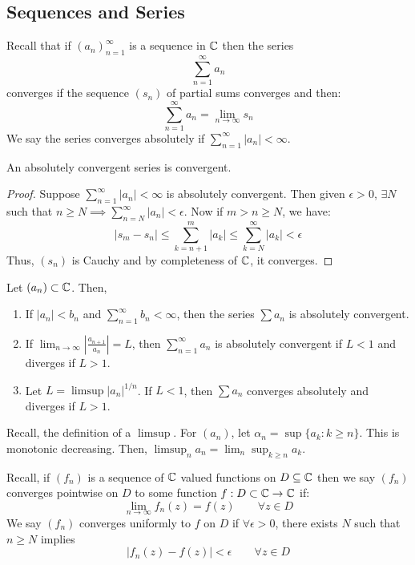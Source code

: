 \documentclass[12pt]{amsart}
\begin{document}
\newpage

\subsection{Sequences and Series}
Recall that if $(a_n)_{n=1}^\infty$ is a sequence in $\mathbb C$ then the series 
\[ \sum_{n=1}^\infty a_n\]
converges if the sequence $(s_n)$ of partial sums converges and then:
\[\sum_{n=1}^\infty a_n = \lim_{n\to \infty} s_n \]
We say the series converges absolutely if $\sum_{n=1}^\infty |a_n| < \infty$. 

\begin{lemma}[W 1.2.9]
    An absolutely convergent series is convergent.
\end{lemma}
\begin{proof}
    Suppose $\sum_{n=1}^\infty |a_n| < \infty$ is absolutely convergent. Then given $\epsilon > 0$, $\exists N$ such that $n \geq N \implies \sum_{n=N}^\infty |a_n| < \epsilon$. Now if $m > n \geq N$, we have: 
    \[ |s_m - s_n| \leq \sum_{k=n+1}^m | a_k | \leq \sum_{k = N}^\infty |a_k| < \epsilon\]
    Thus, $(s_n)$ is Cauchy and by completeness of $\mathbb C$, it converges. 
\end{proof}

\begin{theorem}[W 1.1.30]
    Let $(a_n) \subset \mathbb C$. Then,
    \begin{enumerate}
        \item If $|a_n| < b_n$ and $\sum_{n=1}^\infty b_n < \infty$, then the series $\sum a_n$ is absolutely convergent. 
        \item If $\lim_{n \to \infty} \left|\frac{a_{n+1}}{a_n}\right| = L$, then $\sum_{n=1}^\infty a_n$ is absolutely convergent if $L < 1$ and diverges if $L > 1$. 
        \item Let $L = \limsup |a_n|^{1/n}$. If $L < 1$, then $\sum a_n$ converges absolutely and diverges if $L > 1$. 
    \end{enumerate}
\end{theorem}

Recall, the definition of a $\limsup$. For $(a_n)$, let $\alpha_n = \sup \{ a_k : k \geq n\}$. This is monotonic decreasing. Then, $\limsup_n a_n = \lim_n \sup_{k\geq n} a_k$. 

Recall, if $(f_n)$ is a sequence of $\mathbb C$ valued functions on $D \subseteq \mathbb C$ then we say $(f_n)$ converges pointwise on $D$ to some function $f: D \subset \mathbb C \to \mathbb C$ if:
\[ \lim_{n\to \infty} f_n(z) = f(z) \qquad \forall z \in D\]
We say $(f_n)$ converges uniformly to $f$ on $D$ if $\forall \epsilon > 0$, there exists $N$ such that $n \geq N$ implies
\[ |f_n(z)-f(z)| < \epsilon \qquad \forall z \in D\]
\end{document}
